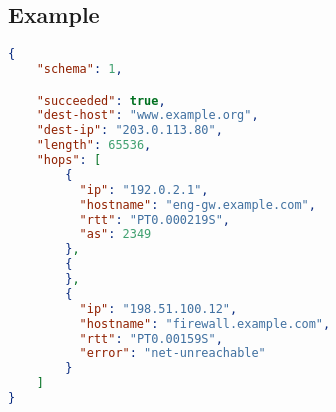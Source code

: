\documentclass[10pt]{article}
\begin{document}
\subsection{Example}
\begin{lstlisting}[language=json]
{
    "schema": 1,

    "succeeded": true,
    "dest-host": "www.example.org",
    "dest-ip": "203.0.113.80",
    "length": 65536,
    "hops": [
        {
          "ip": "192.0.2.1",
          "hostname": "eng-gw.example.com",
          "rtt": "PT0.000219S",
          "as": 2349
        },
        {
        },
        {
          "ip": "198.51.100.12",
          "hostname": "firewall.example.com",
          "rtt": "PT0.00159S",
          "error": "net-unreachable"
        }
    ]
}
\end{lstlisting}
\end{document}
